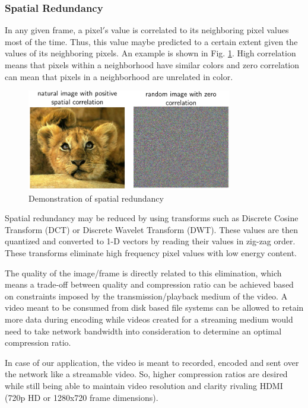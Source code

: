 \documentclass[letterpaper,12pt,titlepage,oneside,final]{report}
\begin{document}
            \subsubsection{Spatial Redundancy} %
            \label{sub:spatial_redundancy}
                In any given frame, a pixel$'$s value is correlated to its neighboring pixel values most of the time. Thus, this value maybe predicted to a certain extent given the values of its neighboring pixels. An example is shown in Fig. \ref{spatredund}. High correlation means that pixels within a neighborhood have similar colors and zero correlation can mean that pixels in a neighborhood are unrelated in color.
                \begin{figure}[!h]
                    \centering
                    \includegraphics[width=0.8\textwidth]{spatredund}
                    \caption{Demonstration of spatial redundancy\cite{Kundur}}
                    \label{spatredund}
                \end{figure}
                Spatial redundancy may be reduced by using transforms such as Discrete Cosine Transform (DCT) or Discrete Wavelet Transform (DWT). These values are then quantized and converted to 1-D vectors by reading their values in zig-zag order. These transforms eliminate high frequency pixel values with low energy content. 

                The quality of the image/frame is directly related to this elimination, which means a trade-off between quality and compression ratio can be achieved based on constraints imposed by the transmission/playback medium of the video. A video meant to be consumed from disk based file systems can be allowed to retain more data during encoding while videos created for a streaming medium would need to take network bandwidth into consideration to determine an optimal compression ratio.

                In case of our application, the video is meant to recorded, encoded and sent over the network like a streamable video. So, higher compression ratios are desired while still being able to maintain video resolution and clarity rivaling HDMI (720p HD or 1280x720 frame dimensions).
\end{document}
